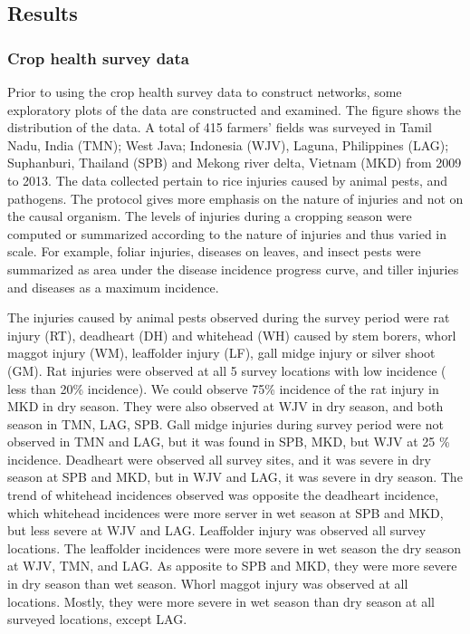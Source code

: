 
\subsection{Results}

\subsubsection{Crop health survey data}

Prior to using the crop health survey data to construct networks, some exploratory plots of the data are constructed and examined. The figure shows the distribution of the data. A total of 415 farmers' fields was surveyed in Tamil Nadu, India (TMN); West Java; Indonesia (WJV), Laguna, Philippines (LAG); Suphanburi, Thailand (SPB) and Mekong river delta, Vietnam (MKD) from 2009 to 2013. The data collected pertain to rice injuries caused by animal pests, and pathogens. The protocol gives more emphasis on the nature of injuries and not on the causal organism. The levels of injuries during a cropping season were computed or summarized according to the nature of injuries and thus varied in scale. For example, foliar injuries, diseases on leaves, and insect pests were summarized as area under the disease incidence progress curve, and tiller injuries and diseases as a maximum incidence. 

The injuries caused by animal pests observed during the survey period were rat injury (RT), deadheart (DH) and whitehead (WH) caused by stem borers, whorl maggot injury (WM), leaffolder injury (LF), gall midge injury or silver shoot (GM). Rat injuries were observed at all 5 survey locations with low incidence ( less than 20\% incidence). We could observe 75\% incidence of the rat injury in MKD in dry season. They were also observed at WJV in dry season, and both season in TMN, LAG, SPB. Gall midge injuries during survey period were not observed in TMN and LAG, but it was found in SPB, MKD, but WJV at 25 \% incidence. Deadheart were observed all survey sites, and it was severe in dry season at SPB and MKD, but in WJV and LAG, it was severe in dry season. The trend of whitehead incidences observed was opposite the deadheart incidence, which whitehead incidences were more server in wet season at SPB and MKD, but less severe at WJV and LAG. Leaffolder injury was observed all survey locations. The leaffolder incidences were more severe in wet season the dry season at WJV, TMN, and LAG. As apposite to SPB and MKD, they were more severe in dry season than wet season. Whorl maggot injury was observed at all locations. Mostly, they were more severe in wet season than dry season at all surveyed locations, except LAG.

